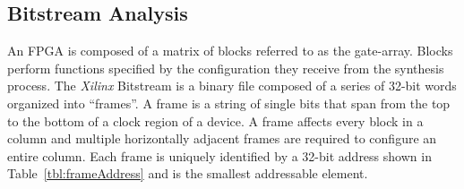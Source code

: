 \documentclass[journal, hidelinks]{IEEEtran}
\begin{document}
\subsection{Bitstream Analysis} \label{sec:bitstreamComposition}

An FPGA is composed of a matrix of blocks referred to as the gate-array.
Blocks perform functions specified by the configuration they receive from the synthesis process.
The \textit{Xilinx} Bitstream is a binary file composed of a series of 32-bit words organized into ``frames''.
A frame is a string of single bits that span from the top to the bottom of a clock region of a device.
A frame affects every block in a column and multiple horizontally adjacent frames are required to configure an entire column.
Each frame is uniquely identified by a 32-bit address shown in Table~\ref{tbl:frameAddress} and is the smallest addressable element.

\end{document}
